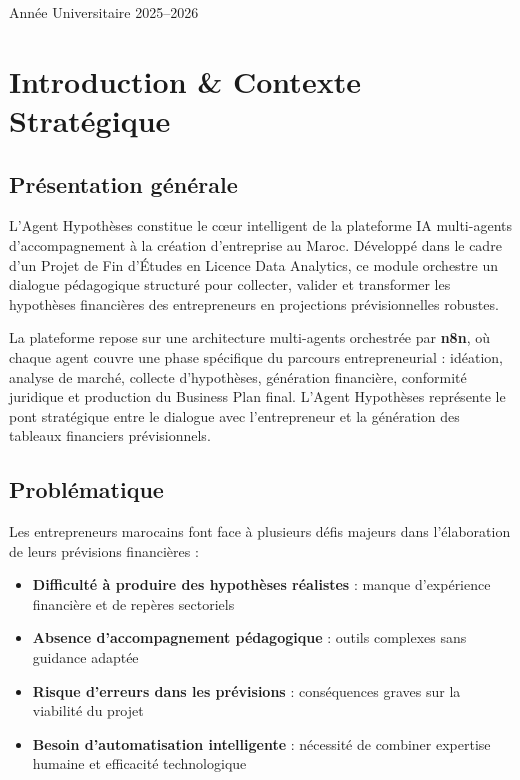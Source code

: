\documentclass[12pt, a4paper]{report}
\begin{document}
\begin{titlepage}
\begin{center}
\vfill

{\small\color{rulegray} Année Universitaire 2025--2026}

\end{center}
\end{titlepage}

\nopagecolor
\color{black}

\tableofcontents
\newpage

\chapter{Introduction \& Contexte Stratégique}

\section{Présentation générale}

L'Agent Hypothèses constitue le cœur intelligent de la plateforme IA multi-agents d'accompagnement à la création d'entreprise au Maroc. Développé dans le cadre d'un Projet de Fin d'Études en Licence Data Analytics, ce module orchestre un dialogue pédagogique structuré pour collecter, valider et transformer les hypothèses financières des entrepreneurs en projections prévisionnelles robustes.

La plateforme repose sur une architecture multi-agents orchestrée par \textbf{n8n}, où chaque agent couvre une phase spécifique du parcours entrepreneurial : idéation, analyse de marché, collecte d'hypothèses, génération financière, conformité juridique et production du Business Plan final. L'Agent Hypothèses représente le pont stratégique entre le dialogue avec l'entrepreneur et la génération des tableaux financiers prévisionnels.

\section{Problématique}

Les entrepreneurs marocains font face à plusieurs défis majeurs dans l'élaboration de leurs prévisions financières :

\begin{itemize}
  \item \textbf{Difficulté à produire des hypothèses réalistes} : manque d'expérience financière et de repères sectoriels
  \item \textbf{Absence d'accompagnement pédagogique} : outils complexes sans guidance adaptée
  \item \textbf{Risque d'erreurs dans les prévisions} : conséquences graves sur la viabilité du projet
  \item \textbf{Besoin d'automatisation intelligente} : nécessité de combiner expertise humaine et efficacité technologique
\end{itemize}
\end{document}
